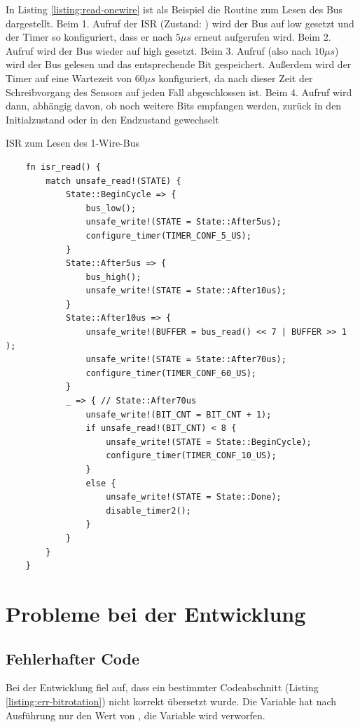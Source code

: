\documentclass
[ 12pt,
  parskip=half %
]{scrreprt}
\newenvironment{mylisting}[1][H]
{\captionsetup{aboveskip=-0.2\normalbaselineskip}\begin{listing}[#1]}
{\end{listing}}
\begin{document}
In Listing \ref{listing:read-onewire} ist als Beispiel die Routine zum Lesen des Bus dargestellt. Beim 1. Aufruf der ISR (Zustand: ) wird der Bus auf low gesetzt und der Timer so konfiguriert, dass er nach $5 \mu{s}$ erneut aufgerufen wird. Beim 2. Aufruf wird der Bus wieder auf high gesetzt. Beim 3. Aufruf (also nach $10 \mu{s}$) wird der Bus gelesen und das entsprechende Bit gespeichert. Außerdem wird der Timer auf eine Wartezeit von $60 \mu{s}$ konfiguriert, da nach dieser Zeit der Schreibvorgang des Sensors auf jeden Fall abgeschlossen ist. Beim 4. Aufruf wird dann, abhängig davon, ob noch weitere Bits empfangen werden, zurück in den Initialzustand oder in den Endzustand gewechselt
 
\begin{mylisting}
	\caption{ISR zum Lesen des 1-Wire-Bus}
	\label{listing:read-onewire}
	\begin{verbatim}
	fn isr_read() {
		match unsafe_read!(STATE) {
			State::BeginCycle => {
				bus_low();          
				unsafe_write!(STATE = State::After5us);
				configure_timer(TIMER_CONF_5_US);
			}
			State::After5us => {
				bus_high();         
				unsafe_write!(STATE = State::After10us);
			}
			State::After10us => {
				unsafe_write!(BUFFER = bus_read() << 7 | BUFFER >> 1 );     
				unsafe_write!(STATE = State::After70us);
				configure_timer(TIMER_CONF_60_US);
			}
			_ => { // State::After70us
				unsafe_write!(BIT_CNT = BIT_CNT + 1);
				if unsafe_read!(BIT_CNT) < 8 {
					unsafe_write!(STATE = State::BeginCycle);
					configure_timer(TIMER_CONF_10_US);
				}
				else {
					unsafe_write!(STATE = State::Done);
					disable_timer2();
				}
			}
		}
	}
	\end{verbatim}
\end{mylisting} 

\section{Probleme bei der Entwicklung}

\subsection{Fehlerhafter Code}

Bei der Entwicklung fiel auf, dass ein bestimmter Codeabschnitt (Listing \ref{listing:err-bitrotation}) nicht korrekt übersetzt wurde. Die Variable  hat nach Ausführung nur den Wert von , die Variable  wird verworfen.
\end{document}
